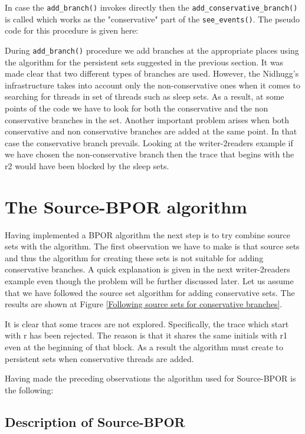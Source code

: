 In case the \verb|add_branch()| invokes directly then the \verb|add_conservative_branch()| is called which works as the "conservative"
part of the \verb|see_events()|. The pseudo code for this procedure is given here:

During \verb|add_branch()| procedure we add branches at the appropriate places using the algorithm for the persistent sets suggested in the previous section.
It was made clear that two different types of branches are used. However, the Nidhugg's infrastructure takes into account only the non-conservative ones when it comes
to searching for threads in set of threads such as sleep sets. As a result, at some points of the code we have to look for both the conservative and the non conservative
branches in the set. 
Another important problem arises when both conservative and non conservative branches are added at the same point. In that case the conservative branch prevails.
Looking at the writer-2readers example if we have chosen the non-conservative branch then the trace that begins with the r2 would have been blocked by the sleep sets.

\section{The Source-BPOR algorithm}
Having implemented a BPOR algorithm the next step is to try combine source sets with the algorithm. The first observation we have to make is that
source sets and thus the algorithm for creating these sets is not suitable for adding conservative branches. A quick explanation is given in the next writer-2readers example
even though the problem will be further discussed later. Let us assume that we have followed the source set algorithm for adding conservative sets. 
The results are shown at Figure \ref{Following source sets for conservative branches}.


It is clear that some traces are not explored. Specifically, the trace which start with r has been rejected. The reason is that it shares the same initials with r1 even at the
beginning of that block. As a result the algorithm must create to persistent sets when conservative threads are added. 

Having made the preceding observations the algorithm used for Source-BPOR is the following:

\subsection{Description of Source-BPOR}

